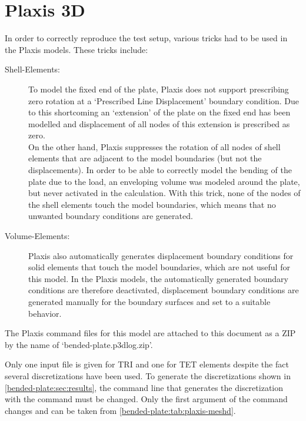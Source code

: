 
\section{Plaxis 3D}
\label{bended-plate:sec:plaxis3D}

In order to correctly reproduce the test setup, various tricks had to be used
in the Plaxis models. These tricks include:

\begin{description}
    \item [Shell-Elements:]{To model the fixed end of the plate, Plaxis does not
          support prescribing zero rotation at a ‘Prescribed Line
          Displacement’ boundary condition. Due to this shortcoming
          an ‘extension’ of the plate on the fixed end has been
          modelled and displacement of all nodes of this extension is
          prescribed as zero.\\
          On the other hand, Plaxis suppresses the rotation of all nodes
          of shell elements that are adjacent to the model boundaries (but
          not the displacements). In order to be able to correctly model the
          bending of the plate due to the load, an enveloping volume was
          modeled around the plate, but never activated in the calculation.
          With this trick, none of the nodes of the shell elements touch the
          model boundaries, which means that no unwanted boundary conditions
          are generated.}
    \item [Volume-Elements:]{Plaxis also automatically generates displacement
          boundary conditions for solid elements that touch the model boundaries,
          which are not useful for this model. In the Plaxis models, the
          automatically generated boundary conditions are therefore deactivated,
          displacement boundary conditions are generated manually for the
          boundary surfaces and set to a suitable behavior.}
\end{description}

The Plaxis command files for this model are attached to this document as a ZIP
by the name of ‘bended-plate.p3dlog.zip’.


Only one input file is given for TRI and one for TET elements despite the fact
several discretizations have been used. To generate the discretizations shown
in \autoref{bended-plate:sec:results}, the command line that generates the
discretization with the  command must be changed. Only the
first argument of the  command changes and can be taken from
\autoref{bended-plate:tab:plaxis-meshd}.

